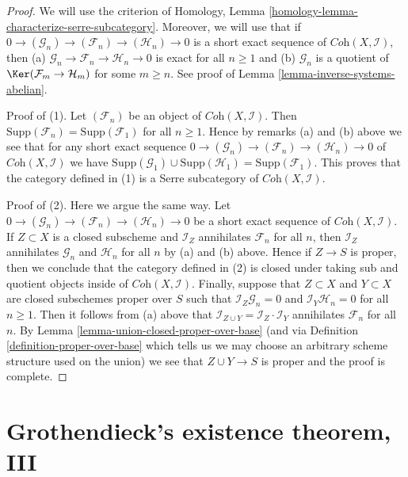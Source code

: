 \begin{proof}
We will use the criterion of
Homology, Lemma \ref{homology-lemma-characterize-serre-subcategory}.
Moreover, we will use that if
$0 \to (\mathcal{G}_n) \to (\mathcal{F}_n) \to (\mathcal{H}_n) \to 0$
is a short exact sequence of $\textit{Coh}(X, \mathcal{I})$, then
(a) $\mathcal{G}_n \to \mathcal{F}_n \to \mathcal{H}_n \to 0$
is exact for all $n \geq 1$ and
(b) $\mathcal{G}_n$ is a quotient of $\Ker(\mathcal{F}_m \to \mathcal{H}_m)$
for some $m \geq n$. See proof of Lemma \ref{lemma-inverse-systems-abelian}.

\medskip\noindent
Proof of (1). Let $(\mathcal{F}_n)$ be an object of
$\textit{Coh}(X, \mathcal{I})$. Then
$\text{Supp}(\mathcal{F}_n) = \text{Supp}(\mathcal{F}_1)$ for all $n \geq 1$.
Hence by remarks (a) and (b) above we see that
for any short exact sequence
$0 \to (\mathcal{G}_n) \to (\mathcal{F}_n) \to (\mathcal{H}_n) \to 0$
of $\textit{Coh}(X, \mathcal{I})$ we have
$\text{Supp}(\mathcal{G}_1) \cup \text{Supp}(\mathcal{H}_1) =
\text{Supp}(\mathcal{F}_1)$.
This proves that the category defined in (1)
is a Serre subcategory of $\textit{Coh}(X, \mathcal{I})$.

\medskip\noindent
Proof of (2). Here we argue the same way. Let
$0 \to (\mathcal{G}_n) \to (\mathcal{F}_n) \to (\mathcal{H}_n) \to 0$
be a short exact sequence of $\textit{Coh}(X, \mathcal{I})$.
If $Z \subset X$ is a closed subscheme and $\mathcal{I}_Z$
annihilates $\mathcal{F}_n$ for all $n$, then
$\mathcal{I}_Z$ annihilates $\mathcal{G}_n$ and $\mathcal{H}_n$
for all $n$ by (a) and (b) above.
Hence if $Z \to S$ is proper, then we conclude that the category
defined in (2) is closed under taking sub and quotient objects
inside of $\textit{Coh}(X, \mathcal{I})$.
Finally, suppose that $Z \subset X$ and $Y \subset X$ are
closed subschemes proper over $S$ such that
$\mathcal{I}_Z \mathcal{G}_n = 0$ and
$\mathcal{I}_Y \mathcal{H}_n = 0$ for all $n \geq 1$.
Then it follows from (a) above that
$\mathcal{I}_{Z \cup Y} = \mathcal{I}_Z \cdot \mathcal{I}_Y$
annihilates $\mathcal{F}_n$ for all $n$.
By Lemma \ref{lemma-union-closed-proper-over-base}
(and via Definition \ref{definition-proper-over-base} which
tells us we may choose an arbitrary scheme structure used on the union)
we see that $Z \cup Y \to S$ is proper and the proof is complete.
\end{proof}








\section{Grothendieck's existence theorem, III}
\label{section-existence-proper-support}


